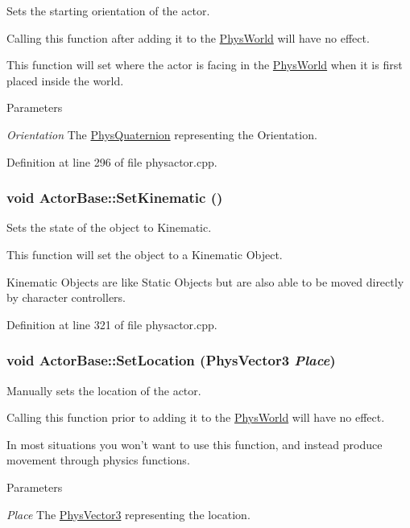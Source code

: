 Sets the starting orientation of the actor. 

Calling this function after adding it to the \hyperlink{classPhysWorld}{PhysWorld} will have no effect. \par
 This function will set where the actor is facing in the \hyperlink{classPhysWorld}{PhysWorld} when it is first placed inside the world. 
\begin{DoxyParams}{Parameters}
\item[{\em Orientation}]The \hyperlink{classPhysQuaternion}{PhysQuaternion} representing the Orientation. \end{DoxyParams}


Definition at line 296 of file physactor.cpp.

\hypertarget{classActorBase_a2d5f990e8c6925b7e44e9ec85f379e6a}{
\subsubsection[{SetKinematic}]{\setlength{\rightskip}{0pt plus 5cm}void ActorBase::SetKinematic ()}}
\label{dd/d7b/classActorBase_a2d5f990e8c6925b7e44e9ec85f379e6a}


Sets the state of the object to Kinematic. 

This function will set the object to a Kinematic Object. \par
 Kinematic Objects are like Static Objects but are also able to be moved directly by character controllers. 

Definition at line 321 of file physactor.cpp.

\hypertarget{classActorBase_a2a204add0b036de441ebd59d14939000}{
\subsubsection[{SetLocation}]{\setlength{\rightskip}{0pt plus 5cm}void ActorBase::SetLocation ({\bf PhysVector3} {\em Place})}}
\label{dd/d7b/classActorBase_a2a204add0b036de441ebd59d14939000}


Manually sets the location of the actor. 

Calling this function prior to adding it to the \hyperlink{classPhysWorld}{PhysWorld} will have no effect. \par
 In most situations you won't want to use this function, and instead produce movement through physics functions. 
\begin{DoxyParams}{Parameters}
\item[{\em Place}]The \hyperlink{classPhysVector3}{PhysVector3} representing the location. \end{DoxyParams}



